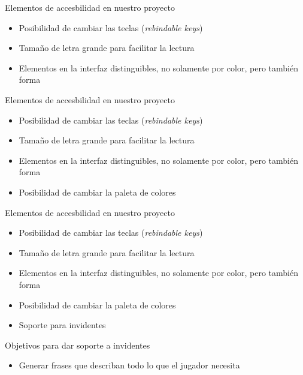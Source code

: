 \begin{tframe}{Elementos de accesbilidad en nuestro proyecto}
	\begin{itemize}
		\item Posibilidad de cambiar las teclas (\textit{rebindable keys})
		\item Tamaño de letra grande para facilitar la lectura
		\item<+-| alert@+> Elementos en la interfaz distinguibles, no solamente por color, pero también forma
	\end{itemize}
\end{tframe}

\begin{tframe}{Elementos de accesbilidad en nuestro proyecto}
	\begin{itemize}
		\item Posibilidad de cambiar las teclas (\textit{rebindable keys})
		\item Tamaño de letra grande para facilitar la lectura
		\item Elementos en la interfaz distinguibles, no solamente por color, pero también forma
		\item<+-| alert@+> Posibilidad de cambiar la paleta de colores
	\end{itemize}
\end{tframe}

\begin{tframe}{Elementos de accesbilidad en nuestro proyecto}
	\begin{itemize}
		\item Posibilidad de cambiar las teclas (\textit{rebindable keys})
		\item Tamaño de letra grande para facilitar la lectura
		\item Elementos en la interfaz distinguibles, no solamente por color, pero también forma
		\item Posibilidad de cambiar la paleta de colores
		\item<+-| alert@+> Soporte para invidentes
	\end{itemize}
\end{tframe}


\begin{tframe}{Objetivos para dar soporte a invidentes}
	\begin{itemize}
		\item<+-| alert@+> Generar frases que describan todo lo que el jugador necesita		
	\end{itemize}
\end{tframe}

